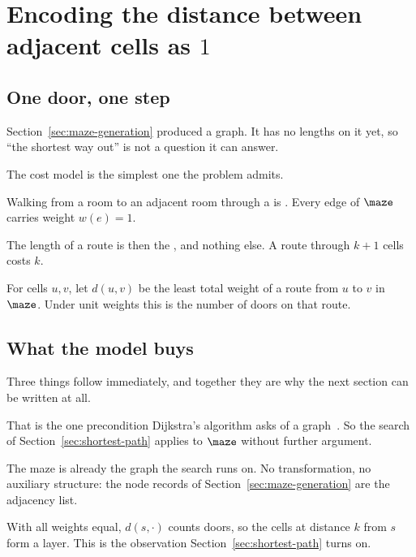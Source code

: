 \section{Encoding the distance between adjacent cells as \texorpdfstring{$1$}{1}}
\label{sec:unit-edge-weights}

\subsection{One door, one step}

Section~\ref{sec:maze-generation} produced a graph. It has no lengths on it yet,
so ``the shortest way out'' is not a question it can answer.

The cost model is the simplest one the problem admits.

\begin{keypoint}
Walking from a room to an adjacent room through a  is
. Every edge of $\maze$ carries weight $w(e)=1$.
\end{keypoint}

The length of a route is then the , and
nothing else. A route through $k+1$ cells costs $k$.

\begin{definition}
For cells $u,v$, let $d(u,v)$ be the least total weight of a route from $u$ to
$v$ in $\maze$. Under unit weights this is the number of doors on that route.
\end{definition}

\subsection{What the model buys}

Three things follow immediately, and together they are why the next section can
be written at all.

\begin{description}[leftmargin=*,style=nextline,itemsep=5pt]
  \item[The weights are non-negative.] That is the one precondition Dijkstra's
    algorithm asks of a graph~\cite{dijkstra1959note}. So the search of
    Section~\ref{sec:shortest-path} applies to $\maze$ without further argument.
  \item[Every cell is a vertex; every door is an edge.] The maze is already the
    graph the search runs on. No transformation, no auxiliary structure: the
    node records of Section~\ref{sec:maze-generation} are the adjacency list.
  \item[Distance is depth.] With all weights equal, $d(s,\cdot)$ counts doors,
    so the cells at distance $k$ from $s$ form a layer. This is the observation
    Section~\ref{sec:shortest-path} turns on.
\end{description}

